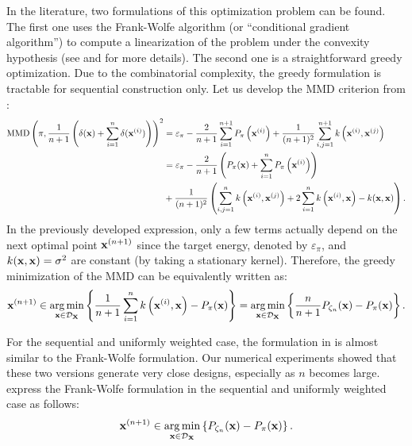 In the literature, two formulations of this optimization problem can be found. 
The first one uses the Frank-Wolfe algorithm (or ``conditional gradient algorithm'') to compute a linearization of the problem under the convexity hypothesis (see \cite{lacoste_2015} and \cite{briol_2015} for more details). 
The second one is a straightforward greedy optimization. Due to the combinatorial complexity, the greedy formulation is tractable for sequential construction only. 
Let us develop the MMD criterion from :
\begin{subequations}
\begin{align}
    \mathrm{MMD}\left(\pi, \frac{1}{n+1} \left(\delta({\bf x}) + \sum_{i=1}^{n} \delta({\bf x}^{(i)})\right)\right)^2
    &= \varepsilon_\pi - \frac{2}{n+1} \sum_{i=1}^{n+1} P_{\pi}\left({\bf x}^{(i)}\right) + \frac{1}{(n+1)^2} \sum_{i,j=1}^{n+1} k\left({\bf x}^{(i)}, {\bf x}^{(j)}\right)\\
    &= \varepsilon_\pi - \frac{2}{n+1} \left(P_\pi({\bf x}) + \sum_{i=1}^n P_{\pi}\left({\bf x}^{(i)}\right)\right)\\ &+ \frac{1}{(n+1)^2} \left(\sum_{i,j=1}^n k\left({\bf x}^{(i)}, {\bf x}^{(j)}\right) + 2\sum_{i=1}^n k\left({\bf x}^{(i)}, {\bf x}\right) - k({\bf x}, {\bf x}) \right).
\end{align}
\end{subequations}
In the previously developed expression, only a few terms actually depend on the next optimal point ${\bf x}^{(n+1)}$ since the target energy, denoted by $\varepsilon_\pi$, and $k({\bf x}, {\bf x})=\sigma^2$ are constant (by taking a stationary kernel). 
Therefore, the greedy minimization of the MMD can be equivalently written as: 
\begin{equation}
    {\bf x}^{(n+1)} \in \operatorname*{arg\,min}_{{\bf x} \in \mathcal{D}_{{\bf X}}} \left\{ \frac{1}{n+1} \sum_{i=1}^n k\left({\bf x}^{(i)}, {\bf x}\right) - P_\pi({\bf x}) \right\} = \operatorname*{arg\,min}_{{\bf x} \in \mathcal{D}_{{\bf X}}} \left\{ \frac{n}{n+1} P_{\zeta_n}({\bf x}) - P_{\pi}({\bf x})\right\}.
    \label{eq:greedy_formulation}
\end{equation}

\medskip
\begin{remark}
For the sequential and uniformly weighted case, the formulation in  is almost similar to the Frank-Wolfe formulation. 
Our numerical experiments showed that these two versions generate very close designs, especially as $n$ becomes large. 
\cite{pronzato_rendas_2021} express the Frank-Wolfe formulation in the sequential and uniformly weighted case as follows:
\begin{align}
   {\bf x}^{(n+1)} \in \operatorname*{arg\,min}_{{\bf x} \in \mathcal{D}_{{\bf X}}} \left\{P_{\zeta_n}({\bf x}) - P_{\pi}({\bf x})\right\}.
   \label{eq:kh_criterion}
\end{align}
\end{remark}
\smallskip

